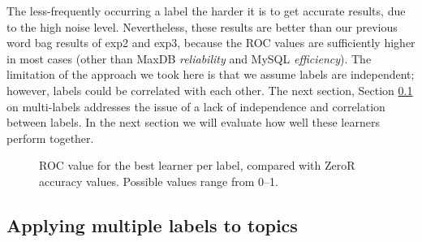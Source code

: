\documentclass[]{sig-alternate}
\begin{document}
The less-frequently occurring a label the harder it is to get accurate
results, due to the high noise level. Nevertheless, these results are
better than our previous word bag results of \textsf{exp2} and
\textsf{exp3}, because the ROC values are sufficiently higher in most
cases (other than MaxDB \emph{reliability} and MySQL \emph{efficiency}). The
limitation of the approach we took here is that we assume labels are
independent; however, labels could be correlated with each other. 
The next section, Section \ref{sec:multilabel} on multi-labels
addresses the issue of a lack of independence and correlation between labels.
In the next section we will evaluate how well these learners perform
together.

\begin{figure}[ht]
\centering
{}
\caption[]{ROC value for the best learner per label, compared with ZeroR accuracy values.  Possible values range from 0--1.
}
\label{fig:best-learn-per-tag}
\end{figure}

\subsection{Applying multiple labels to topics}
\label{sec:multilabel}
\end{document}
